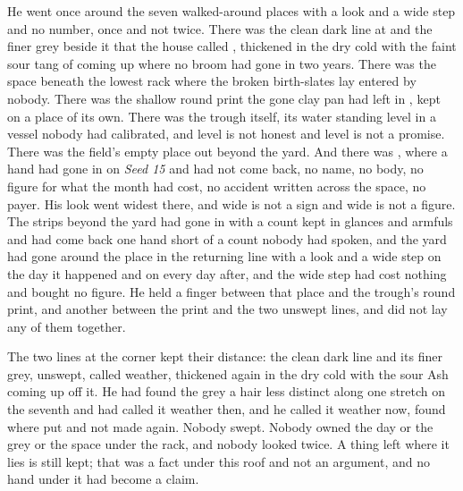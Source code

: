 \scenebreak

He went once around the seven walked-around places with a look and a wide step and no number, once and not twice. There was the clean dark line at  and the finer grey beside it that the house called , thickened in the dry cold with the faint sour tang of  coming up where no broom had gone in two years. There was the space beneath the lowest rack where the broken birth-slates lay entered by nobody. There was the shallow round print the gone clay pan had left in , kept on a place of its own. There was the trough itself, its water standing level in a vessel nobody had calibrated, and level is not honest and level is not a promise. There was the field's empty place out beyond the yard. And there was , where a hand had gone in on \emph{Seed 15} and had not come back, no name, no body, no figure for what the month had cost, no accident written across the space, no payer. His look went widest there, and wide is not a sign and wide is not a figure. The strips beyond the yard had gone in with a count kept in glances and armfuls and had come back one hand short of a count nobody had spoken, and the yard had gone around the place in the returning line with a look and a wide step on the day it happened and on every day after, and the wide step had cost nothing and bought no figure. He held a finger between that place and the trough's round print, and another between the print and the two unswept lines, and did not lay any of them together.

The two lines at the corner kept their distance: the clean dark line and its finer grey, unswept, called weather, thickened again in the dry cold with the sour Ash coming up off it. He had found the grey a hair less distinct along one stretch on the seventh and had called it weather then, and he called it weather now, found where put and not made again. Nobody swept. Nobody owned the day or the grey or the space under the rack, and nobody looked twice. A thing left where it lies is still kept; that was a fact under this roof and not an argument, and no hand under it had become a claim.

